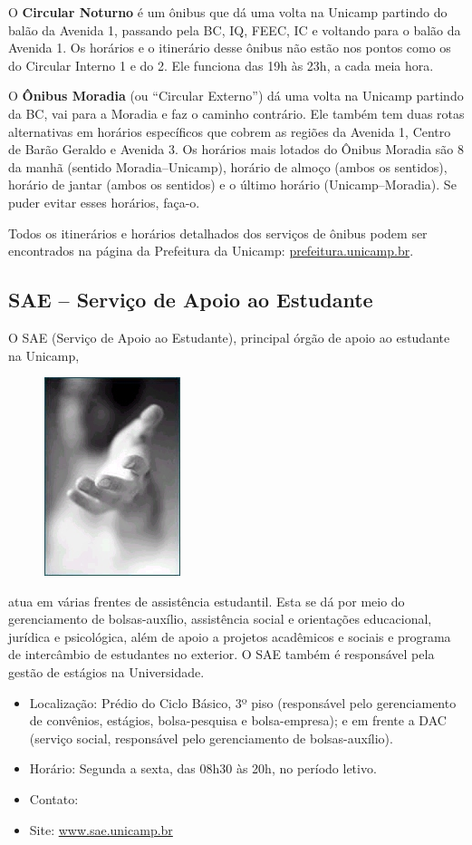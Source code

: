 O \textbf{Circular Noturno} é um ônibus que dá uma volta na Unicamp partindo do
balão da Avenida 1, passando pela BC, IQ, FEEC, IC e voltando para o balão da
Avenida 1.  Os horários e o itinerário desse ônibus não estão nos pontos como os
do Circular Interno 1 e do 2. Ele funciona das 19h às 23h, a cada meia hora.

O \textbf{Ônibus Moradia} (ou ``Circular Externo'') dá uma volta na Unicamp
partindo da BC, vai para a Moradia e faz o caminho contrário. Ele também tem
duas rotas alternativas em horários específicos que cobrem as regiões da Avenida
1, Centro de Barão Geraldo e Avenida 3. Os horários mais lotados do Ônibus
Moradia são 8 da manhã (sentido Moradia--Unicamp), horário de almoço (ambos os
sentidos), horário de jantar (ambos os sentidos) e o último horário
(Unicamp--Moradia). Se puder evitar esses horários, faça-o.

Todos os itinerários e horários detalhados dos serviços de ônibus podem ser
encontrados na página da Prefeitura da Unicamp: \url{prefeitura.unicamp.br}.

\subsection{SAE -- Serviço de Apoio ao Estudante}

O SAE (Serviço de Apoio ao Estudante), principal órgão de apoio ao estudante na
Unicamp,
\begin{figure}
    \centering
    \includegraphics[width=.2\textwidth]{img/alem_da_graduacao/sae.jpg}
\end{figure}
atua em várias frentes de assistência estudantil. Esta se dá por meio do
gerenciamento de bolsas-auxílio, assistência social e orientações educacional,
jurídica e psicológica, além de apoio a projetos acadêmicos e sociais e programa
de intercâmbio de estudantes no exterior. O SAE também é responsável pela gestão
de estágios na Universidade.

\begin{itemize}
    \item  Localização: Prédio do Ciclo Básico, 3º piso (responsável pelo
        gerenciamento de convênios, estágios, bolsa-pesquisa e bolsa-empresa); e
        em frente a DAC (serviço social, responsável pelo gerenciamento de
        bolsas-auxílio).
    \item  Horário: Segunda a sexta, das 08h30 às 20h, no período letivo.
    \item  Contato: 
    \item  Site: \url{www.sae.unicamp.br}
\end{itemize}

